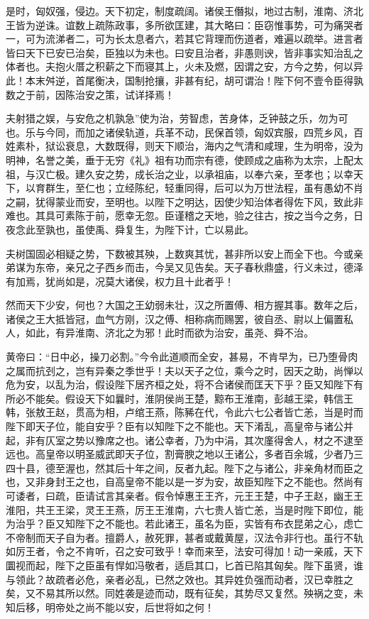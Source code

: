 \documentclass[12pt,UTF8]{ctexbook}
\begin{document}
是时，匈奴强，侵边。天下初定，制度疏阔。诸侯王僭拟，地过古制，淮南、济北王皆为逆诛。谊数上疏陈政事，多所欲匡建，其大略曰：臣窃惟事势，可为痛哭者一，可为流涕者二，可为长太息者六，若其它背理而伤道者，难遍以疏举。进言者皆曰天下已安已治矣，臣独以为未也。曰安且治者，非愚则谀，皆非事实知治乱之体者也。夫抱火厝之积薪之下而寝其上，火未及燃，因谓之安，方今之势，何以异此！本末舛逆，首尾衡决，国制抢攘，非甚有纪，胡可谓治！陛下何不壹令臣得孰数之于前，因陈治安之策，试详择焉！



夫射猎之娱，与安危之机孰急”使为治，劳智虑，苦身体，乏钟鼓之乐，勿为可也。乐与今同，而加之诸侯轨道，兵革不动，民保首领，匈奴宾服，四荒乡风，百姓素朴，狱讼衰息，大数既得，则天下顺治，海内之气清和咸理，生为明帝，没为明神，名誉之美，垂于无穷《礼》祖有功而宗有德，使顾成之庙称为太宗，上配太祖，与汉亡极。建久安之势，成长治之业，以承祖庙，以奉六亲，至孝也；以幸天下，以育群生，至仁也；立经陈纪，轻重同得，后可以为万世法程，虽有愚幼不肖之嗣，犹得蒙业而安，至明也。以陛下之明达，因使少知治体者得佐下风，致此非难也。其具可素陈于前，愿幸无忽。臣谨稽之天地，验之往古，按之当今之务，日夜念此至孰也，虽使禹、舜复生，为陛下计，亡以易此。



夫树国固必相疑之势，下数被其殃，上数爽其忧，甚非所以安上而全下也。今或亲弟谋为东帝，亲兄之子西乡而击，今吴又见告矣。天子春秋鼎盛，行义未过，德泽有加焉，犹尚如是，况莫大诸侯，权力且十此者乎！



然而天下少安，何也？大国之王幼弱未壮，汉之所置傅、相方握其事。数年之后，诸侯之王大抵皆冠，血气方刚，汉之傅、相称病而赐罢，彼自丞、尉以上偏置私人，如此，有异淮南、济北之为邪！此时而欲为治安，虽尧、舜不治。



黄帝曰：“日中必，操刀必割。”今令此道顺而全安，甚易，不肯早为，已乃堕骨肉之属而抗刭之，岂有异秦之季世乎！夫以天子之位，乘今之时，因天之助，尚惮以危为安，以乱为治，假设陛下居齐桓之处，将不合诸侯而匡天下乎？臣又知陛下有所必不能矣。假设天下如曩时，淮阴侯尚王楚，黥布王淮南，彭越王梁，韩信王韩，张敖王赵，贯高为相，卢绾王燕，陈豨在代，令此六七公者皆亡恙，当是时而陛下即天子位，能自安乎？臣有以知陛下之不能也。天下淆乱，高皇帝与诸公并起，非有仄室之势以豫席之也。诸公幸者，乃为中涓，其次廑得舍人，材之不逮至远也。高皇帝以明圣威武即天子位，割膏腴之地以王诸公，多者百余城，少者乃三四十县，德至渥也，然其后十年之间，反者九起。陛下之与诸公，非亲角材而臣之也，又非身封王之也，自高皇帝不能以是一岁为安，故臣知陛下之不能也。然尚有可诿者，曰疏，臣请试言其亲者。假令悼惠王王齐，元王王楚，中子王赵，幽王王淮阳，共王王梁，灵王王燕，厉王王淮南，六七贵人皆亡恙，当是时陛下即位，能为治乎？臣又知陛下之不能也。若此诸王，虽名为臣，实皆有布衣昆弟之心，虑亡不帝制而天子自为者。擅爵人，赦死罪，甚者或戴黄屋，汉法令非行也。虽行不轨如厉王者，令之不肯听，召之安可致乎！幸而来至，法安可得加！动一亲戚，天下圜视而起，陛下之臣虽有悍如冯敬者，适启其口，匕首已陷其匈矣。陛下虽贤，谁与领此？故疏者必危，亲者必乱，已然之效也。其异姓负强而动者，汉已幸胜之矣，又不易其所以然。同姓袭是迹而动，既有征矣，其势尽又复然。殃祸之变，未知后移，明帝处之尚不能以安，后世将如之何！
\end{document}
